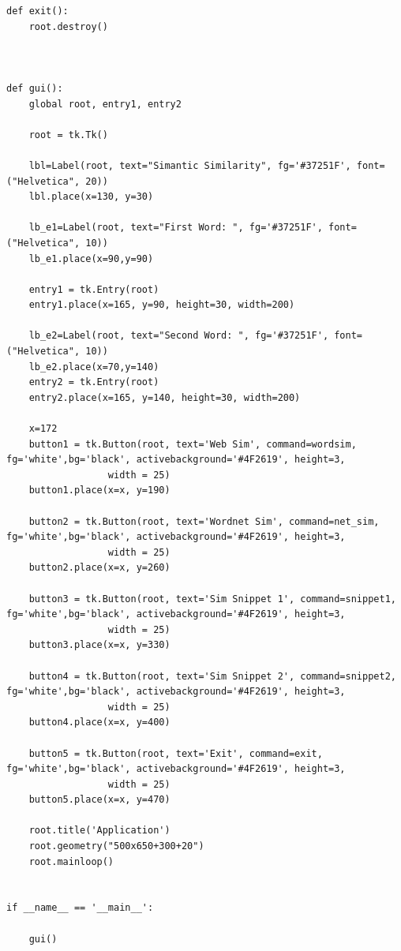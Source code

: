 \documentclass[conference]{IEEEtran}
\begin{document}
\begin{appendices}
\begin{lstlisting}
def exit():
    root.destroy()
    


def gui():
    global root, entry1, entry2
    
    root = tk.Tk()

    lbl=Label(root, text="Simantic Similarity", fg='#37251F', font=("Helvetica", 20))
    lbl.place(x=130, y=30)
    
    lb_e1=Label(root, text="First Word: ", fg='#37251F', font=("Helvetica", 10))
    lb_e1.place(x=90,y=90)
    
    entry1 = tk.Entry(root) 
    entry1.place(x=165, y=90, height=30, width=200)

    lb_e2=Label(root, text="Second Word: ", fg='#37251F', font=("Helvetica", 10))
    lb_e2.place(x=70,y=140)    
    entry2 = tk.Entry(root)
    entry2.place(x=165, y=140, height=30, width=200)
    
    x=172
    button1 = tk.Button(root, text='Web Sim', command=wordsim, fg='white',bg='black', activebackground='#4F2619', height=3,
                  width = 25)
    button1.place(x=x, y=190)
    
    button2 = tk.Button(root, text='Wordnet Sim', command=net_sim, fg='white',bg='black', activebackground='#4F2619', height=3,
                  width = 25)
    button2.place(x=x, y=260)
    
    button3 = tk.Button(root, text='Sim Snippet 1', command=snippet1, fg='white',bg='black', activebackground='#4F2619', height=3,
                  width = 25)
    button3.place(x=x, y=330)
    
    button4 = tk.Button(root, text='Sim Snippet 2', command=snippet2, fg='white',bg='black', activebackground='#4F2619', height=3,
                  width = 25)
    button4.place(x=x, y=400)

    button5 = tk.Button(root, text='Exit', command=exit, fg='white',bg='black', activebackground='#4F2619', height=3,
                  width = 25)
    button5.place(x=x, y=470)
    
    root.title('Application')
    root.geometry("500x650+300+20")
    root.mainloop()


if __name__ == '__main__':

    gui()
\end{lstlisting}
\end{appendices}
\end{document}
